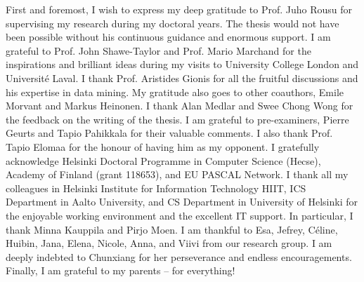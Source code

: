 

\begin{preface}[Espoo]

%
First and foremost, I wish to express my deep gratitude to Prof. Juho Rousu for supervising my research during my doctoral years.
The thesis would not have been possible without his continuous guidance and enormous support. 
%
I am grateful to Prof. John Shawe-Taylor and Prof. Mario Marchand for the inspirations and brilliant ideas during my visits to University College London and Universit\'e Laval.
%
I thank Prof. Aristides Gionis for all the fruitful discussions and his expertise in data mining.
My gratitude also goes to other coauthors, Emile Morvant and Markus Heinonen. 
%
I thank Alan Medlar and Swee Chong Wong for the feedback on the writing of the thesis.
I am grateful to pre-examiners, Pierre Geurts and Tapio Pahikkala for their valuable comments.
I also thank Prof. Tapio Elomaa for the honour of having him as my opponent.
%
I gratefully acknowledge Helsinki Doctoral Programme in Computer Science (Hecse), Academy of Finland (grant 118653), and EU PASCAL Network.
% 
I thank all my colleagues in Helsinki Institute for Information Technology HIIT, ICS Department in Aalto University, and CS Department in University of Helsinki for the enjoyable working environment and the excellent IT support.
In particular, I thank Minna Kauppila and Pirjo Moen.
%
I am thankful to Esa, Jefrey, C\'eline, Huibin, Jana, Elena, Nicole, Anna, and Viivi from our research group.
%
I am deeply indebted to Chunxiang for her perseverance and endless encouragements.
%
Finally, I am grateful to my parents -- for everything! 


\end{preface}
